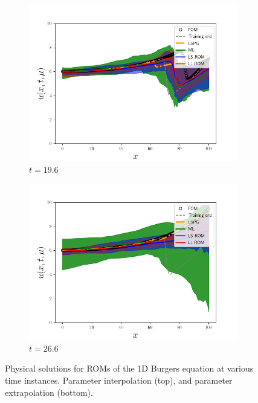 \documentclass[3p,computermodern,10pt]{elsarticle}
\begin{document}
\begin{figure}
\begin{center}
\begin{subfigure}[t]{0.24\textwidth}
\includegraphics[trim={0cm 0cm 0cm 0cm},clip,width=1.0\linewidth]{code/burgers/synapse_models/basis_study/results/figures/uquartiles_mu1_7_mu2_7_t_0280.png} 
\caption{$t=19.6$}
\end{subfigure}
\begin{subfigure}[t]{0.24\textwidth}
\includegraphics[trim={0cm 0cm 0cm 0cm},clip,width=1.0\linewidth]{code/burgers/synapse_models/basis_study/results/figures/uquartiles_mu1_7_mu2_7_t_0380.png} 
\caption{$t=26.6$}
\end{subfigure}

\caption{Physical solutions for ROMs of the 1D Burgers equation at various time instances. Parameter interpolation (top), and parameter extrapolation (bottom).}
\label{fig:burg_phys_space}
\end{center}
\end{figure}
\end{document}
